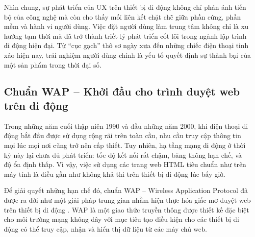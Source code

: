   \begin{flushleft}
    \hspace*{0.8cm}Nhìn chung, sự phát triển của UX trên thiết bị di động không chỉ phản ánh tiến bộ của công nghệ mà còn cho thấy mối liên kết chặt chẽ giữa phần cứng, phần mềm và hành vi người dùng. Việc đặt người dùng làm trung tâm không chỉ là xu hướng tạm thời mà đã trở thành triết lý phát triển cốt lõi trong ngành lập trình di động hiện đại. Từ “cục gạch” thô sơ ngày xưa đến những chiếc điện thoại tinh xảo hiện nay, trải nghiệm người dùng chính là yếu tố quyết định sự thành bại của một sản phẩm trong thời đại số.
  \end{flushleft}

\subsection{Chuẩn WAP – Khởi đầu cho trình duyệt web trên di động}
\renewcommand{\labelitemi}{--}    
\begin{flushleft}
  \hspace*{0.8cm}Trong những năm cuối thập niên 1990 và đầu những năm 2000, khi điện thoại di động bắt đầu được sử dụng rộng rãi trên toàn cầu, nhu cầu truy cập thông tin mọi lúc mọi nơi cũng trở nên cấp thiết. Tuy nhiên, hạ tầng mạng di động ở thời kỳ này lại chưa đủ phát triển: tốc độ kết nối rất chậm, băng thông hạn chế, và độ ổn định thấp. Vì vậy, việc sử dụng các trang web HTML tiêu chuẩn như trên máy tính là điều gần như không khả thi trên thiết bị di động lúc bấy giờ.
  \end{flushleft}
  
  \begin{flushleft}
  \hspace*{0.8cm}Để giải quyết những hạn chế đó, chuẩn WAP – Wireless Application Protocol đã được ra đời như một giải pháp trung gian nhằm hiện thực hóa giấc mơ duyệt web trên thiết bị di động \cite{wap-intro}. WAP là một giao thức truyền thông được thiết kế đặc biệt cho môi trường mạng không dây với mục tiêu tạo điều kiện cho các thiết bị di động có thể truy cập, nhận và hiển thị dữ liệu từ các máy chủ web.
  \end{flushleft}

